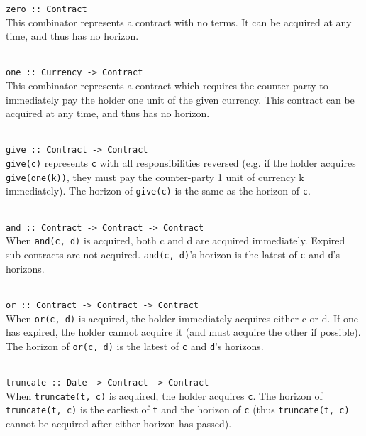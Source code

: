 \parbox{\textwidth}{
\texttt{zero :: Contract} \\

This combinator represents a contract with no terms. It can be acquired at any time, and thus has no horizon. \\ \\

}

\parbox{\textwidth}{
\texttt{one :: Currency -> Contract} \\

This combinator represents a contract which requires the counter-party to immediately pay the holder one unit of the given currency. This contract can be acquired at any time, and thus has no horizon. \\ \\
}

\parbox{\textwidth}{
\texttt{give :: Contract -> Contract} \\

\texttt{give(c)} represents \texttt{c} with all responsibilities reversed (e.g. if the holder acquires \texttt{give(one(k))}, they must pay the counter-party 1 unit of currency k immediately). The horizon of \texttt{give(c)} is the same as the horizon of \texttt{c}. \\ \\

}

\parbox{\textwidth}{
\texttt{and :: Contract -> Contract -> Contract} \\

When \texttt{and(c, d)} is acquired, both c and d are acquired immediately. Expired sub-contracts are not acquired. \texttt{and(c, d)}'s horizon is the latest of \texttt{c} and \texttt{d}'s horizons. \\ \\
}

\parbox{\textwidth}{
\texttt{or :: Contract -> Contract -> Contract} \\

When \texttt{or(c, d)} is acquired, the holder immediately acquires either c or d. If one has expired, the holder cannot acquire it (and must acquire the other if possible). The horizon of \texttt{or(c, d)} is the latest of \texttt{c} and \texttt{d}'s horizons. \\ \\
}

\parbox{\textwidth}{
\texttt{truncate :: Date -> Contract -> Contract} \\

When \texttt{truncate(t, c)} is acquired, the holder acquires \texttt{c}. The horizon of \texttt{truncate(t, c)} is the earliest of \texttt{t} and the horizon of \texttt{c} (thus \texttt{truncate(t, c)} cannot be acquired after either horizon has passed). \\ \\
}

